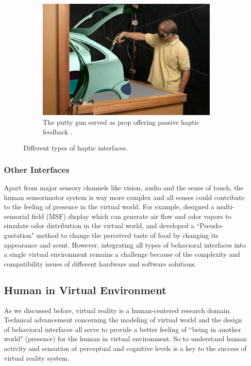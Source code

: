 \begin{figure}[htb]
  \begin{subfigure}{.32\textwidth}
    \centering
    \includegraphics[width=0.9\linewidth]{figures/ch1/prop}
    \caption{The putty gun served as prop offering passive haptic feedback \citep{Ortega2005Prop}.}
    \label{fig:1_hi:prop}
  \end{subfigure}
  \caption{\label{fig:1_hi}Different types of haptic interfaces.}
\end{figure}

\subsubsection{Other Interfaces}
Apart from major sensory channels like vision, audio and the sense of touch, the human sensorimotor system is way more complex and all senses could contribute to the feeling of presence in the virtual world. For example, \citet{Matsukura2011MSF} designed a multi-sensorial field (MSF) display which can generate air flow and odor vapors to simulate odor distribution in the virtual world, and \citet{Narumi2011Flavors} developed a ``Pseudo-gustation" method to change the perceived taste of food by changing its appearance and scent. However, integrating all types of behavioral interfaces into a single virtual environment remains a challenge because of the complexity and compatibility issues of different hardware and software solutions. 


\subsection{Human in Virtual Environment}
As we discussed before, virtual reality is a human-centered research domain. Technical advancement concerning the modeling of virtual world and the design of behavioral interfaces all serve to provide a better feeling of ``being in another world" (presence) for the human in virtual environment. So to understand human activity and sensation at perceptual and cognitive levels is a key to the success of virtual reality system.

